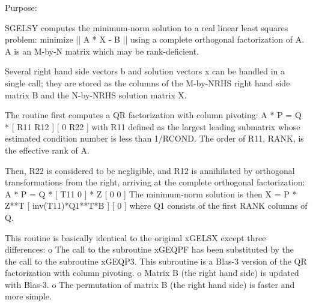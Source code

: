  \begin{DoxyParagraph}{Purpose\+: }
\begin{DoxyVerb} SGELSY computes the minimum-norm solution to a real linear least
 squares problem:
     minimize || A * X - B ||
 using a complete orthogonal factorization of A.  A is an M-by-N
 matrix which may be rank-deficient.

 Several right hand side vectors b and solution vectors x can be
 handled in a single call; they are stored as the columns of the
 M-by-NRHS right hand side matrix B and the N-by-NRHS solution
 matrix X.

 The routine first computes a QR factorization with column pivoting:
     A * P = Q * [ R11 R12 ]
                 [  0  R22 ]
 with R11 defined as the largest leading submatrix whose estimated
 condition number is less than 1/RCOND.  The order of R11, RANK,
 is the effective rank of A.

 Then, R22 is considered to be negligible, and R12 is annihilated
 by orthogonal transformations from the right, arriving at the
 complete orthogonal factorization:
    A * P = Q * [ T11 0 ] * Z
                [  0  0 ]
 The minimum-norm solution is then
    X = P * Z**T [ inv(T11)*Q1**T*B ]
                 [        0         ]
 where Q1 consists of the first RANK columns of Q.

 This routine is basically identical to the original xGELSX except
 three differences:
   o The call to the subroutine xGEQPF has been substituted by the
     the call to the subroutine xGEQP3. This subroutine is a Blas-3
     version of the QR factorization with column pivoting.
   o Matrix B (the right hand side) is updated with Blas-3.
   o The permutation of matrix B (the right hand side) is faster and
     more simple.\end{DoxyVerb}
 
\end{DoxyParagraph}

